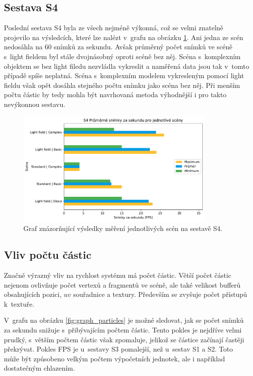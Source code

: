 \subsection*{Sestava S4}
Poslední sestava S4 byla ze všech nejméně výkonná, což se velmi znatelně projevilo na výsledcích, které lze nalézt v~grafu na obrázku \ref{fig:graphS4Basic}. Ani jedna ze scén nedosáhla na 60 snímků za sekundu. Avšak průměrný počet snímků ve scéně s~light fieldem byl stále dvojnásobný oproti scéně bez něj. Scéna s~komplexním objektem se bez light filedu nezvládla vykreslit a naměřená data jsou tak v~tomto případě spíše neplatná. Scéna s~komplexním modelem vykresleným pomocí light fieldu však opět dosáhla stejného počtu snímku jako scéna bez něj. Při menším počtu částic by tedy mohla být navrhovaná metoda výhodnější i pro takto nevýkonnou sestavu.  

\begin{figure}[H]
	\centering
		\includegraphics[width=0.88\textwidth]{obrazky-figures/graphS4basic.pdf}
	\caption{Graf znázorňující výsledky měření jednotlivých scén na sestavě S4.}
	\label{fig:graphS4Basic}
\end{figure}

\subsection{Vliv počtu částic}
Značně výrazný vliv na rychlost systému má počet částic. Větší počet částic nejenom ovlivňuje počet vertexů a fragmentů ve scéně, ale také velikost bufferů obsahujících pozici, $uv$ souřadnice a textury. Především se zvyšuje počet přístupů k~textuře. 

V~grafu na obrázku \ref{fig:graph_particles} je možné sledovat, jak se počet snímků za sekundu snižuje s~přibývajícím počtem  částic. Tento pokles je nejdříve velmi prudký, s~větším počtem částic však zpomaluje, jelikož se částice začínají častěji překrývat. Pokles FPS je u~sestavy S3 pomalejší, než u~sestav S1 a S2. Toto může být způsobeno velkým počtem výpočetních jednotek, ale i například dostatečným chlazením.

